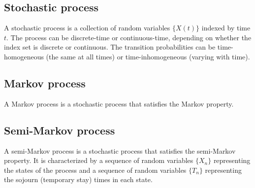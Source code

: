 \subsection{Stochastic process}

A stochastic process is a collection of random variables \( \{ X(t) \} \) indexed by time \( t \).
The process can be discrete-time or continuous-time, depending on whether the index set is discrete or continuous.
The transition probabilities can be time-homogeneous (the same at all times) or time-inhomogeneous (varying with time).

\subsection{Markov process}

A Markov process is a stochastic process that satisfies the Markov property.

\subsection{Semi-Markov process}

A semi-Markov process is a stochastic process that satisfies the semi-Markov property.
It is characterized by a sequence of random variables \( \{ X_n \} \) representing the states of the process and a sequence of random variables \( \{ T_n \} \) representing the sojourn (temporary stay) times in each state.
